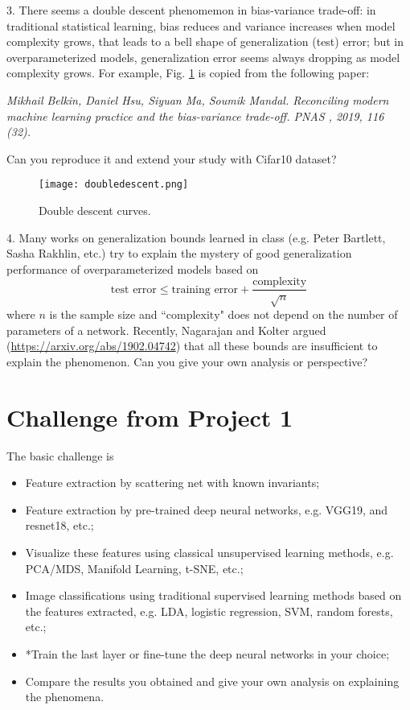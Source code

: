 \documentclass[11pt]{article}
\begin{document}
3. There seems a double descent phenomemon in bias-variance trade-off: in traditional statistical learning, bias reduces and variance increases when model complexity grows, that leads to a bell shape of generalization (test) error; but in overparameterized models, generalization error seems always dropping as model complexity grows. For example, Fig. \ref{fig:doubledescent} is copied from the following paper:

\emph{Mikhail Belkin, Daniel Hsu, Siyuan Ma, Soumik Mandal. Reconciling modern machine learning practice and the bias-variance trade-off. PNAS , 2019, 116 (32). }

Can you reproduce it and extend your study with Cifar10 dataset? 

\begin{figure}
\begin{centering}
\texttt{[image: doubledescent.png]}  
\caption{Double descent curves.}
\label{fig:doubledescent}
\end{centering}
\end{figure}

4. Many works on generalization bounds learned in class (e.g. Peter Bartlett, Sasha Rakhlin, etc.) try to explain the mystery of good generalization performance of overparameterized models based on
\[ \text{test error} \leq \text{training error} + \frac{\text{complexity}}{\sqrt{n}} \]
where $n$ is the sample size and ``$\text{complexity}$" does not depend on the number of parameters of a network. Recently, Nagarajan and Kolter argued (\url{https://arxiv.org/abs/1902.04742}) that all these bounds are insufficient to explain the phenomenon. Can you give your own analysis or perspective?

\section{Challenge from Project 1}
The basic challenge is 
\begin{itemize}
\item Feature extraction by scattering net with known invariants; 
\item Feature extraction by pre-trained deep neural networks, e.g. VGG19, and resnet18, etc.;
\item Visualize these features using classical unsupervised learning methods, e.g. PCA/MDS, Manifold Learning, t-SNE, etc.; 
\item Image classifications using traditional supervised learning methods based on the features extracted, e.g. LDA, logistic regression, SVM, random forests, etc.;
\item *Train the last layer or fine-tune the deep neural networks in your choice; 
\item Compare the results you obtained and give your own analysis on explaining the phenomena.
\end{itemize}
\end{document}
